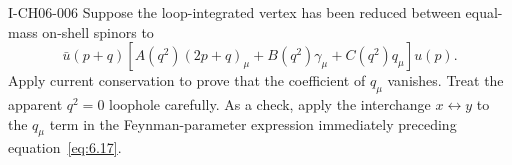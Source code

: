 \begin{exercise}{I-CH06-006}
Suppose the loop-integrated vertex has been reduced between equal-mass
on-shell spinors to
\[
 \bar u(p+q)\left[A(q^2)(2p+q)_\mu+B(q^2)\gamma_\mu
 +C(q^2)q_\mu\right]u(p).
\]
Apply current conservation to prove that the coefficient of \(q_\mu\)
vanishes.  Treat the apparent \(q^2=0\) loophole carefully.  As a check,
apply the interchange \(x\leftrightarrow y\) to the \(q_\mu\) term in the
Feynman-parameter expression immediately preceding equation~\eqref{eq:6.17}.
\end{exercise}
